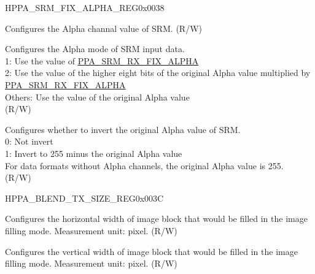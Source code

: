 \begin{register}{H}{PPA\_SRM\_FIX\_ALPHA\_REG}{0x0038}\label{regdesc:PPASRMFIXALPHAREG}
%
%
%
%
\regnewline%
\begin{regdesc}\begin{reglist}
\label{fielddesc:PPASRMRXFIXALPHA}\item [PPA\_SRM\_RX\_FIX\_ALPHA] Configures the Alpha channal value of SRM. (R/W)
\label{fielddesc:PPASRMRXALPHAMOD}\item [PPA\_SRM\_RX\_ALPHA\_MOD] Configures the Alpha mode of SRM input data.\\
1: Use the value of \hyperref[fielddesc:PPASRMRXFIXALPHA]{PPA\_SRM\_RX\_FIX\_ALPHA}\\
2: Use the value of the higher eight bits of the original Alpha value multiplied by \hyperref[fielddesc:PPASRMRXFIXALPHA]{PPA\_SRM\_RX\_FIX\_ALPHA}\\
Others: Use the value of the original Alpha value\\
(R/W)
\label{fielddesc:PPASRMRXALPHAINV}\item [PPA\_SRM\_RX\_ALPHA\_INV] Configures whether to invert the original Alpha value of SRM.\\
0: Not invert\\
1: Invert to 255 minus the original Alpha value\\
For data formats without Alpha channels, the original Alpha value is 255. \\
(R/W)
\end{reglist}\end{regdesc}
\end{register}


\begin{register}{H}{PPA\_BLEND\_TX\_SIZE\_REG}{0x003C}\label{regdesc:PPABLENDTXSIZEREG}
%
%
%
\regnewline%
\begin{regdesc}\begin{reglist}
\label{fielddesc:PPABLENDHB}\item [PPA\_BLEND\_HB] Configures the horizontal width of image block that would be filled in the image filling mode. Measurement unit: pixel. (R/W)
\label{fielddesc:PPABLENDVB}\item [PPA\_BLEND\_VB] Configures the vertical width of image block that would be filled in the image filling mode. Measurement unit: pixel. (R/W)
\end{reglist}\end{regdesc}
\end{register}


